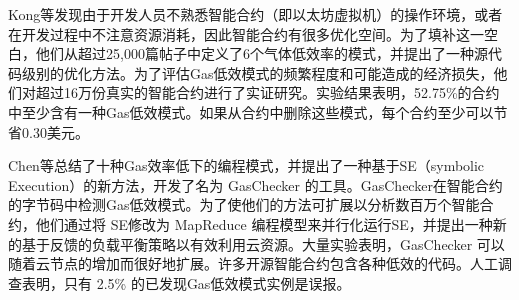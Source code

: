 Kong等\cite{gasPattern}发现由于开发人员不熟悉智能合约（即以太坊虚拟机）的操作环境，或者在开发过程中不注意资源消耗，因此智能合约有很多优化空间。为了填补这一空白，他们从超过25,000篇帖子中定义了6个气体低效率的模式，并提出了一种源代码级别的优化方法。为了评估Gas低效模式的频繁程度和可能造成的经济损失，他们对超过16万份真实的智能合约进行了实证研究。实验结果表明，52.75\%的合约中至少含有一种Gas低效模式。如果从合约中删除这些模式，每个合约至少可以节省0.30美元。

Chen等\cite{GasChecker}总结了十种Gas效率低下的编程模式，并提出了一种基于SE（symbolic Execution）的新方法，开发了名为 GasChecker 的工具。GasChecker在智能合约的字节码中检测Gas低效模式。为了使他们的方法可扩展以分析数百万个智能合约，他们通过将 SE修改为 MapReduce 编程模型来并行化运行SE，并提出一种新的基于反馈的负载平衡策略以有效利用云资源。大量实验表明，GasChecker 可以随着云节点的增加而很好地扩展。许多开源智能合约包含各种低效的代码。人工调查表明，只有 2.5\% 的已发现Gas低效模式实例是误报。




